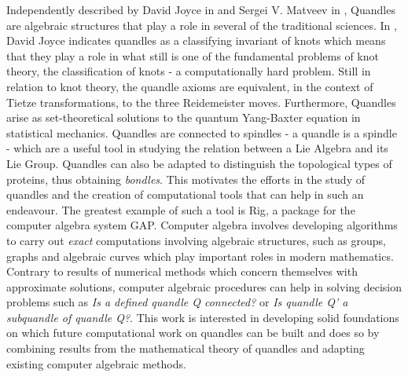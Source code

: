 \documentclass{mcom-l}
\begin{document}


\noindent
Independently described by David Joyce in \cite{JOYCE198237} and Sergei V. Matveev in \cite{SergeiMatveevDisGrou}, Quandles are algebraic structures that play a role in several of the traditional sciences. In \cite{JOYCE198237}, David Joyce indicates quandles as a classifying invariant of knots which means that they play a role in what still is one of the fundamental problems of knot theory, the classification of knots - a computationally hard problem. Still in relation to knot theory, the quandle axioms are equivalent, in the context of Tietze transformations, to the three Reidemeister moves\cite{lie2algebras, nelson2005signed}. Furthermore, Quandles arise as set-theoretical solutions to the quantum Yang-Baxter equation in statistical mechanics\cite{BONATTO2021128}. Quandles are connected to spindles - a quandle is a spindle - which are a useful tool in studying the relation between a Lie Algebra and its Lie Group\cite{lie2algebras}. Quandles can also be adapted to distinguish the topological types of proteins, thus obtaining \emph{bondles}\cite{adams2020knot}. This motivates the efforts in the study of quandles and the creation of computational tools that can help in such an endeavour. The greatest example of such a tool is \textsf{Rig}\cite{RiGapVendramin}, a package for the computer algebra system \textsf{GAP}\cite{GAPLinton}. Computer algebra involves developing algorithms to carry out \emph{exact} computations involving algebraic structures, such as groups, graphs and algebraic curves which play important roles in modern mathematics. Contrary to results of numerical methods which concern themselves with approximate solutions, computer algebraic procedures can help in solving decision problems such as \textit{Is a defined quandle Q connected?} or \textit{Is quandle Q' a subquandle of quandle Q?}. This work is interested in developing solid foundations on which future computational work on quandles can be built and does so by combining results from the mathematical theory of quandles and adapting existing computer algebraic methods.
\end{document}
